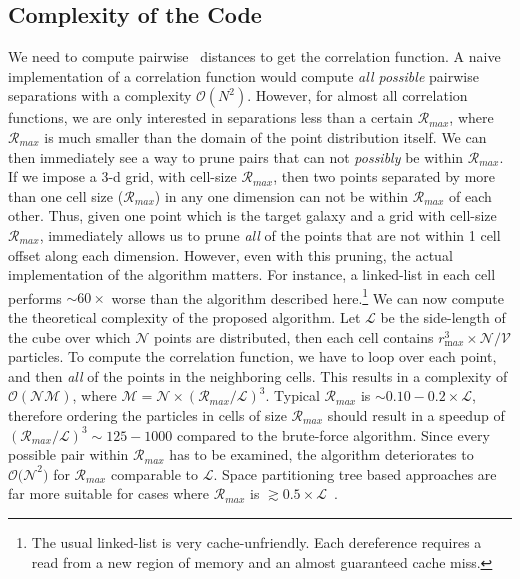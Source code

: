 \documentclass[preprint, 12pt, authoryear]{elsarticle}
\newcommand{\rmax}{\ensuremath{{{\mathcal{R}}_{max}}}\xspace}
\newcommand{\lbox}{\ensuremath{\mathcal{L}}\xspace}
\begin{document}
\subsection{Complexity of the Code}
We need to compute pairwise~\citep{} distances to get the correlation function. A naive implementation of a correlation function would compute {\em all possible} 
pairwise separations with a complexity $\mathcal{O}(N^2)$. However, for almost all correlation functions, we are only interested in separations less than 
a certain \rmax, where \rmax is much smaller than the domain of the point distribution itself. We can then immediately see a way to prune pairs that can not
{\em possibly} be within \rmax. If we impose a 3-d grid, with cell-size \rmax, then two points separated by more than one cell size (\rmax) in any one 
dimension can not be within \rmax of each other. Thus, given one point which is the target galaxy and a grid with cell-size \rmax, 
immediately allows us to prune {\em all} of the points that are not within 1 cell offset along each dimension. However, even with this pruning, the actual 
implementation of the algorithm matters. For instance, a linked-list in each cell performs $\sim 60\times$ worse than the algorithm described here.\footnote{The 
usual linked-list is very cache-unfriendly. Each dereference requires a read
from a new region of memory and an almost guaranteed cache miss. } 
We can now compute the theoretical complexity of the proposed algorithm. Let
\lbox be the side-length of the cube over which $\mathcal{N}$ points are distributed, then
each cell contains $r_{\mathrm max}^3\times \mathcal{N/V}$ particles. To compute the
correlation function, we have to loop over each point, and then {\em all} of
the points in the neighboring cells. This results in a complexity of 
$\mathcal{O(NM)}$, where $\mathcal{M} = \mathcal{N}\times\left(\rmax/\lbox\right)^3$. Typical \rmax is $\sim 0.10-0.2\times
\lbox$, therefore ordering the particles in cells of size \rmax should
result in a speedup of $(\rmax/\lbox)^3 \sim 125-1000$ compared to the
brute-force algorithm. Since every possible pair within \rmax has to be
examined, the algorithm deteriorates to $\mathcal{O(N}^2)$ for \rmax comparable
to \lbox. Space partitioning tree based approaches are far more suitable for
cases where \rmax is $\gtrsim 0.5\times\lbox$~\citep[e.g.,][]{mlpack2013,
  feng_kdcount}. 
\end{document}
